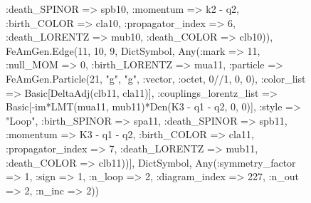 \documentclass{revtex4}
\begin{document}
\begin{figure}[!htb]
\begin{center}
{:death_SPINOR => spb10, :momentum => k2 - q2, :birth_COLOR => cla10, :propagator_index => 6, :death_LORENTZ => mub10, :death_COLOR => clb10)), FeAmGen.Edge(11, 10, 9, Dict{Symbol, Any}(:mark => 11, :null_MOM => 0, :birth_LORENTZ => mua11, :particle => FeAmGen.Particle(21, "g", "g", :vector, :octet, 0//1, 0, 0), :color_list => Basic[DeltaAdj(clb11, cla11)], :couplings_lorentz_list => Basic[-im*LMT(mua11, mub11)*Den(K3 - q1 - q2, 0, 0)], :style => "Loop", :birth_SPINOR => spa11, :death_SPINOR => spb11, :momentum => K3 - q1 - q2, :birth_COLOR => cla11, :propagator_index => 7, :death_LORENTZ => mub11, :death_COLOR => clb11))], Dict{Symbol, Any}(:symmetry_factor => 1, :sign => 1, :n_loop => 2, :diagram_index => 227, :n_out => 2, :n_inc => 2)) 
}
\end{center}
\end{figure}
\end{document}
